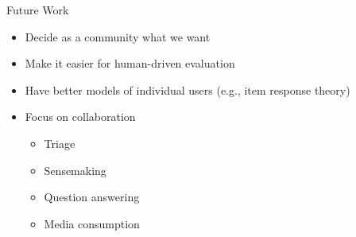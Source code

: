 \documentclass[compress]{beamer}
\begin{document}
\begin{frame}{Future Work}

  \begin{itemize}
  \item Decide as a community what we want
    \item Make it easier for human-driven evaluation
    \item Have better models of individual users (e.g., item response
      theory)
    \item Focus on collaboration
      \begin{itemize}
      \item Triage
      \item Sensemaking
      \item Question answering
        \item Media consumption
      \end{itemize}
  \end{itemize}

\end{frame}
\end{document}
